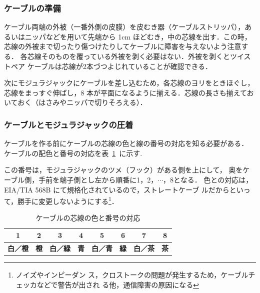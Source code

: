 \subsubsection{ケーブルの準備}
ケーブル両端の外被（一番外側の皮膜）を皮むき器（ケーブルストリッパ），あ
るいはニッパなどを用いて先端から 1cm ほどむき，中の芯線を出す．この時，
芯線の外被まで切ったり傷つけたりしてケーブルに障害を与えないよう注意する．
各芯線そのものを覆っている外被を剥く必要はない．外被を剥くとツイストペア
ケーブルは芯線が2本づつよじれていることが確認できる．

次にモジュラジャックにケーブルを差し込むため，各芯線のヨリをときほぐし，
芯線をまっすぐ伸ばし，8 本が平面になるように揃える．芯線の長さも揃えてお
いておく（はさみやニッパで切りそろえる）．

\subsubsection{ケーブルとモジュラジャックの圧着}
ケーブルを作る前にケーブルの芯線の色と線の番号の対応を知る必要がある．
ケーブルの配色と番号の対応を表~\ref{tab:02:cable}~に示す.

この番号は，モジュラジャックのツメ（フック）がある側を上にして，
奥をケーブル側，手前を端子側とし左から順番に1，2，$\cdots$，8となる．
色との対応は，EIA/TIA 568B にて規格化されているので，ストレートケーブ
ルだからといって，勝手に変更しないようにする\footnote{ノイズやインピーダン
ス，クロストークの問題が発生するため，ケーブルチェッカなどで警告が出され
る他，通信障害の原因になる}．

\begin{table}
\begin{center}
\caption{ケーブルの芯線の色と番号の対応}
\label{tab:02:cable}
\vspace*{1zh}
\begin{tabular}%
{|p{1.2cm}|p{1.2cm}|p{1.2cm}|p{1.2cm}|p{1.2cm}|p{1.2cm}|p{1.2cm}|p{1.2cm}|}\hline
\multicolumn{1}{|c}{1}&%
\multicolumn{1}{|c}{2}&%
\multicolumn{1}{|c}{3}&%
\multicolumn{1}{|c}{4}&%
\multicolumn{1}{|c}{5}&%
\multicolumn{1}{|c}{6}&%
\multicolumn{1}{|c}{7}&%
\multicolumn{1}{|c|}{8}\\\hline\hline
\multicolumn{1}{|c}{\bf 白／橙}&%
\multicolumn{1}{|c}{\bf 橙}&%
\multicolumn{1}{|c}{\bf 白／緑}&%
\multicolumn{1}{|c}{\bf 青}&%
\multicolumn{1}{|c}{\bf 白／青}&%
\multicolumn{1}{|c}{\bf 緑}&%
\multicolumn{1}{|c}{\bf 白／茶}&%
\multicolumn{1}{|c|}{\bf 茶}\\
\hline
\end{tabular}
\end{center}
\end{table}

